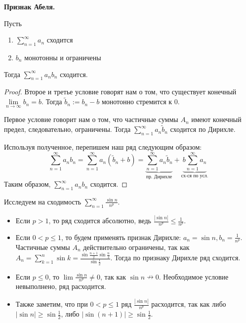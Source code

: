\vspace{6mm}

\textbf{Признак Абеля.} 

Пусть \begin{enumerate}
    \item $\sum\limits_{n=1}^\infty a_n$ сходится
    \item $b_n$ монотонны и ограничены
\end{enumerate}
Тогда $\sum\limits_{n=1}^\infty a_nb_n$ сходится.
\begin{proof}
    Второе и третье условие говорят нам о том, что существует конечный $\lim\limits_{n \to \infty} b_n = b$.
    Тогда $\widetilde{b}_n := b_n - b$ монотонно стремится к 0.

    \quad Первое условие говорит нам о том, что частичные суммы $A_n$ имеют конечный предел, следовательно, ограничены.
    Тогда $\sum\limits_{n=1}^\infty a_n\widetilde{b}_n$ сходится по Дирихле.

    \quad Используя полученное, перепишем наш ряд следующим образом: \[ \sum_{n=1}^\infty a_nb_n = \sum_{n=1}^\infty a_n(\widetilde{b}_n + b) = \underbrace{\sum_{n=1}^\infty a_n\widetilde{b}_n}_{\text{пр. Дирихле}} + \underbrace{b\sum_{n=1}^\infty a_n}_{\text{сх-ся по усл.}} \]
    \quad Таким образом, $\sum\limits_{n=1}^\infty a_nb_n$ сходится.
\end{proof}

\vspace{4mm}

\begin{example}
    Исследуем на сходимость $\sum\limits_{n=1}^\infty \frac{\sin n}{n^p}$.
    \begin{itemize}
        \item Если $p > 1$, то ряд сходится абсолютно, ведь $\frac{|\sin n|}{n^p} \leqslant \frac{1}{n^p}$.
        \item Если $0 < p \leqslant 1$, то будем применять признак Дирихле: $a_n = \sin n, b_n = \frac{1}{n^p}$. 
        Частичные суммы $A_n$ действительно ограничены, так как $A_n = \sum\limits_{k=1}^n \sin k = \frac{\sin \frac{n+1}{2}\sin \frac{n}{2}}{\sin \frac{1}{2}}$. Тогда по признаку Дирихле ряд сходится.
        \item Если $p \leqslant 0$, то $\lim \frac{\sin n}{n^p} \neq 0$, так как $\sin n \nrightarrow 0$. Необходимое условие невыполнено, ряд расходится.
        \item Также заметим, что при $0 < p \leqslant 1$ ряд $\frac{|\sin n|}{n^p}$ расходится, так как либо $|\sin n| \geqslant \sin \frac{1}{2}$, либо $|\sin (n+1)| \geqslant \sin \frac{1}{2}$.
    \end{itemize}
\end{example}

